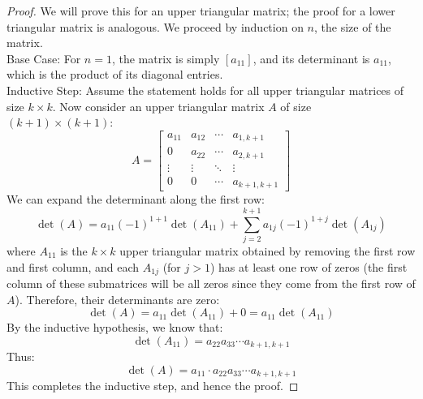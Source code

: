 \begin{proof}
    We will prove this for an upper triangular matrix; the proof for a lower triangular matrix is analogous. We proceed by induction on \(n\), the size of the matrix. \\
    Base Case: For \(n = 1\), the matrix is simply \([a_{11}]\), and its determinant is \(a_{11}\), which is the product of its diagonal entries. \\
    Inductive Step: Assume the statement holds for all upper triangular matrices of size \(k \times k\). Now consider an upper triangular matrix \(A\) of size \((k+1) \times (k+1)\):
    \[
        A = \begin{bmatrix}
            a_{11} & a_{12} & \cdots & a_{1,k+1} \\
            0 & a_{22} & \cdots & a_{2,k+1} \\
            \vdots & \vdots & \ddots & \vdots \\
            0 & 0 & \cdots & a_{k+1,k+1}
        \end{bmatrix}
    \]
    We can expand the determinant along the first row:
    \[
        \det(A) = a_{11} (-1)^{1+1} \det(A_{11}) + \sum_{j=2}^{k+1} a_{1j} (-1)^{1+j} \det(A_{1j})
    \]
    where \(A_{11}\) is the \(k \times k\) upper triangular matrix obtained by removing the first row and first column, and each \(A_{1j}\) (for \(j > 1\)) has at least one row of zeros (the first column of these submatrices will be all zeros since they come from the first row of \(A\)). Therefore, their determinants are zero:
    \[
        \det(A) = a_{11} \det(A_{11}) + 0 = a_{11} \det(A_{11})
    \]
    By the inductive hypothesis, we know that:
    \[
        \det(A_{11}) = a_{22} a_{33} \cdots a_{k+1,k+1}
    \]
    Thus:
    \[
        \det(A) = a_{11} \cdot a_{22} a_{33} \cdots a_{k+1,k+1}
    \]
    This completes the inductive step, and hence the proof.
\end{proof}

